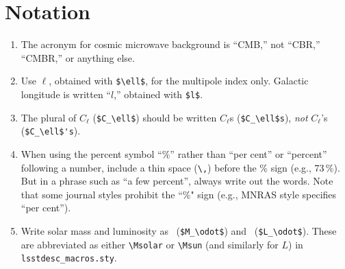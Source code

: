 \documentclass[letterpaper,11pt]{article}
\begin{document}
\section{Notation}

\begin{enumerate}

\item The acronym for cosmic microwave background is ``CMB,'' not ``CBR,''
``CMBR,'' or anything else.

\item Use $\ell$, obtained with \verb|$\ell$|, for the multipole index only.
Galactic longitude is written ``$l$,'' obtained with \verb|$l$|.

\item The plural of $C_\ell$ (\verb|$C_\ell$|) should be written $C_\ell$s
(\verb|$C_\ell$s|), {\it not\/} $C_\ell$'s (\verb|$C_\ell$'s|).
 



\item When using the percent symbol ``\%'' rather than ``per cent'' or ``percent''
following a number, include a thin space (\verb|\,|) before the \% sign (e.g., 73\,\%).
But in a phrase such as ``a few percent'', always write out the words. Note that some journal styles prohibit  the ``\%" sign (e.g., MNRAS style specifies ``per cent'').

\item Write solar mass and luminosity as \Msolar\ (\verb|$M_\odot$|) and \Lsolar\ (\verb|$L_\odot$|). These are abbreviated as either \verb|\Msolar| or \verb|\Msun| (and similarly for $L$) in {\tt lsstdesc\_macros.sty}.



\end{enumerate}
\end{document}
